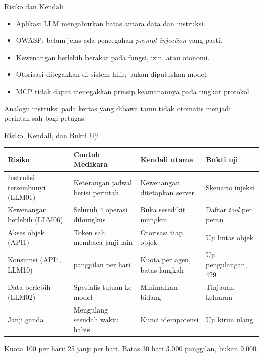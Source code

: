 \documentclass[aspectratio=169, table, 12pt]{beamer}
\begin{document}
\begin{frame}{{\Large Risiko dan Kendali}}
  \vspace{8pt}
  \begin{itemize}
    \item Aplikasi LLM mengaburkan batas antara data dan instruksi.
    \item OWASP: belum jelas ada pencegahan \textit{prompt injection} yang pasti.
    \item Kewenangan berlebih berakar pada fungsi, izin, atau otonomi.
    \item Otorisasi ditegakkan di sistem hilir, bukan diputuskan model.
    \item MCP tidak dapat menegakkan prinsip keamanannya pada tingkat protokol.
  \end{itemize}
  \vspace{6pt}
  {\small Analogi: instruksi pada kertas yang dibawa tamu tidak otomatis menjadi perintah sah bagi petugas.}
\end{frame}

\begin{frame}{{\Large Risiko, Kendali, dan Bukti Uji}}
  \scriptsize
  \begin{tabularx}{\textwidth}{>{\raggedright\arraybackslash}p{3.1cm} >{\raggedright\arraybackslash}X >{\raggedright\arraybackslash}X >{\raggedright\arraybackslash}p{3.0cm}}
    \hline
    \textbf{Risiko} & \textbf{Contoh Medikara} & \textbf{Kendali utama} & \textbf{Bukti uji} \\ \hline
    Instruksi tersembunyi (LLM01) & Keterangan jadwal berisi perintah & Kewenangan ditetapkan server & Skenario injeksi \\ \hline
    Kewenangan berlebih (LLM06) & Seluruh 4 operasi dibungkus & Buka sesedikit mungkin & Daftar \textit{tool} per peran \\ \hline
    Akses objek (API1) & Token sah membaca janji lain & Otorisasi tiap objek & Uji lintas objek \\ \hline
    Konsumsi (API4, LLM10) & 480 panggilan per hari & Kuota per agen, batas langkah & Uji pengulangan, 429 \\ \hline
    Data berlebih (LLM02) & Spesialis tujuan ke model & Minimalkan bidang & Tinjauan keluaran \\ \hline
    Janji ganda & Mengulang sesudah waktu habis & Kunci idempotensi & Uji kirim ulang \\ \hline
  \end{tabularx}

  \vspace{6pt}
  \small Kuota 100 per hari: 25 janji per hari. Batas 30 hari 3.000 panggilan, bukan 9.000.
\end{frame}
\end{document}
